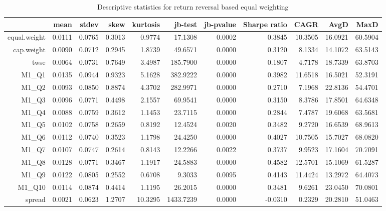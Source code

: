 \begin{table}[ht]
\centering
\begin{tabular}{rrrrrrrrrrr}
  \hline
 & mean & stdev & skew & kurtosis & jb-test & jb-pvalue & Sharpe ratio & CAGR & AvgD & MaxD \\ 
  \hline
equal.weight & 0.0111 & 0.0765 & 0.3013 & 0.9774 & 17.1308 & 0.0002 & 0.3845 & 10.3505 & 16.0921 & 60.5904 \\ 
  cap.weight & 0.0090 & 0.0712 & 0.2945 & 1.8739 & 49.6571 & 0.0000 & 0.3120 & 8.1334 & 14.1072 & 63.5143 \\ 
  twse & 0.0064 & 0.0731 & 0.7649 & 3.4987 & 185.7900 & 0.0000 & 0.1807 & 4.7178 & 18.7339 & 63.8703 \\ 
  M1\_Q1 & 0.0135 & 0.0944 & 0.9323 & 5.1628 & 382.9222 & 0.0000 & 0.3982 & 11.6518 & 16.5021 & 52.3191 \\ 
  M1\_Q2 & 0.0093 & 0.0850 & 0.8874 & 4.3702 & 282.9971 & 0.0000 & 0.2710 & 7.1968 & 22.8136 & 54.4701 \\ 
  M1\_Q3 & 0.0096 & 0.0771 & 0.4498 & 2.1557 & 69.9541 & 0.0000 & 0.3150 & 8.3786 & 17.8501 & 64.6348 \\ 
  M1\_Q4 & 0.0088 & 0.0759 & 0.3612 & 1.1453 & 23.7115 & 0.0000 & 0.2844 & 7.4787 & 19.6068 & 63.5681 \\ 
  M1\_Q5 & 0.0102 & 0.0758 & 0.2659 & 0.8192 & 12.4524 & 0.0020 & 0.3482 & 9.2720 & 16.6539 & 68.9613 \\ 
  M1\_Q6 & 0.0112 & 0.0740 & 0.3523 & 1.1798 & 24.4250 & 0.0000 & 0.4027 & 10.7505 & 15.7027 & 68.0820 \\ 
  M1\_Q7 & 0.0107 & 0.0747 & 0.2614 & 0.8143 & 12.2266 & 0.0022 & 0.3737 & 9.9523 & 17.1604 & 70.7091 \\ 
  M1\_Q8 & 0.0128 & 0.0771 & 0.3467 & 1.1917 & 24.5883 & 0.0000 & 0.4582 & 12.5701 & 15.1069 & 61.5287 \\ 
  M1\_Q9 & 0.0122 & 0.0805 & 0.2552 & 0.6708 & 9.3033 & 0.0095 & 0.4143 & 11.4424 & 13.2972 & 64.4073 \\ 
  M1\_Q10 & 0.0114 & 0.0874 & 0.4414 & 1.1195 & 26.2015 & 0.0000 & 0.3481 & 9.6261 & 23.0450 & 70.0801 \\ 
  spread & 0.0021 & 0.0623 & 1.2707 & 10.3295 & 1433.7239 & 0.0000 & -0.0310 & 0.2329 & 20.2810 & 51.0463 \\ 
   \hline
\end{tabular}
\caption{Descriptive statistics for return reversal based equal weighting} 
\label{tab:returnRevStats}
\end{table}
